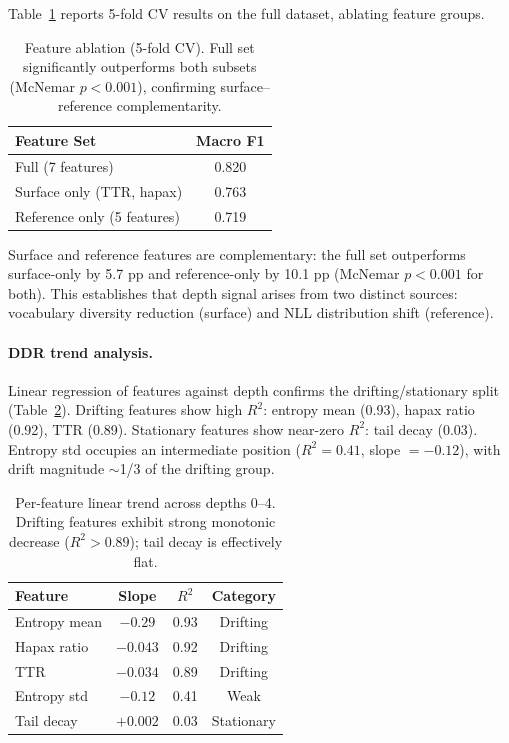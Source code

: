 \documentclass[11pt,twocolumn]{article}
\begin{document}
Table~\ref{tab:ablation} reports 5-fold CV results on the full dataset, ablating feature groups.

\begin{table}[t]
\centering
\small
\begin{tabular}{lc}
\toprule
\textbf{Feature Set} & \textbf{Macro F1} \\
\midrule
Full (7 features) & 0.820 \\
Surface only (TTR, hapax) & 0.763 \\
Reference only (5 features) & 0.719 \\
\bottomrule
\end{tabular}
\caption{Feature ablation (5-fold CV). Full set significantly outperforms both subsets (McNemar $p < 0.001$), confirming surface--reference complementarity.}
\label{tab:ablation}
\end{table}

Surface and reference features are complementary: the full set outperforms surface-only by 5.7 pp and reference-only by 10.1 pp (McNemar $p < 0.001$ for both).
This establishes that depth signal arises from two distinct sources: vocabulary diversity reduction (surface) and NLL distribution shift (reference).

\paragraph{DDR trend analysis.}
Linear regression of features against depth confirms the drifting/stationary split (Table~\ref{tab:trends}).
Drifting features show high $R^2$: entropy mean (0.93), hapax ratio (0.92), TTR (0.89).
Stationary features show near-zero $R^2$: tail decay (0.03).
Entropy std occupies an intermediate position ($R^2 = 0.41$, slope $= -0.12$), with drift magnitude $\sim$1/3 of the drifting group.

\begin{table}[t]
\centering
\small
\begin{tabular}{lccc}
\toprule
\textbf{Feature} & \textbf{Slope} & $R^2$ & \textbf{Category} \\
\midrule
Entropy mean & $-0.29$ & 0.93 & Drifting \\
Hapax ratio & $-0.043$ & 0.92 & Drifting \\
TTR & $-0.034$ & 0.89 & Drifting \\
Entropy std & $-0.12$ & 0.41 & Weak \\
Tail decay & $+0.002$ & 0.03 & Stationary \\
\bottomrule
\end{tabular}
\caption{Per-feature linear trend across depths 0--4. Drifting features exhibit strong monotonic decrease ($R^2 > 0.89$); tail decay is effectively flat.}
\label{tab:trends}
\end{table}
\end{document}
